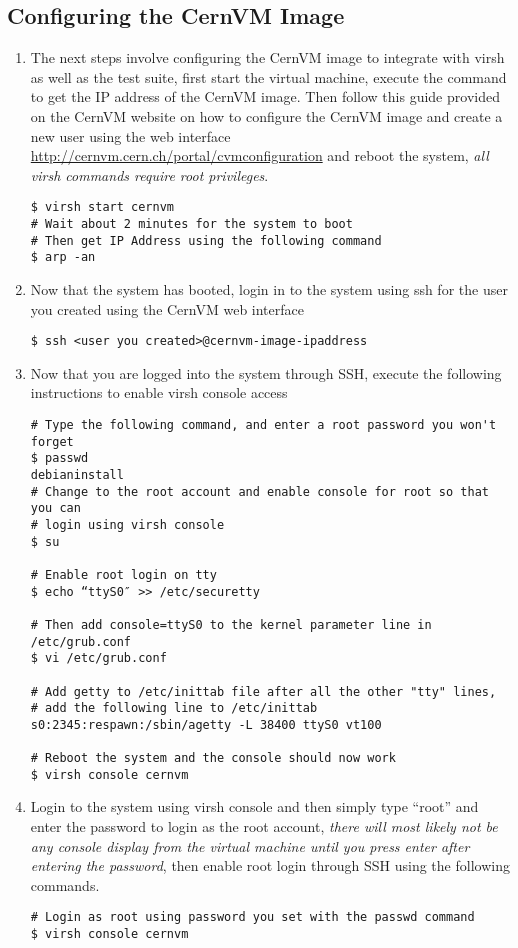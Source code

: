 \subsection{Configuring the CernVM Image}
\label{sec:cernvmconfig}
\begin{enumerate}
\item The next steps involve configuring the CernVM image to integrate with virsh as well as the test suite, first
start the virtual machine, execute the command to get the IP address of the CernVM image. Then follow this guide
provided on the CernVM website on how to configure the CernVM image and create a new user using the web interface \url{http://cernvm.cern.ch/portal/cvmconfiguration} and reboot the system, \emph{all virsh commands require root privileges}.
\begin{lstlisting}
$ virsh start cernvm
# Wait about 2 minutes for the system to boot 
# Then get IP Address using the following command
$ arp -an
\end{lstlisting}

\item Now that the system has booted, login in to the system using ssh for the user you created using the CernVM web interface
\begin{lstlisting}
$ ssh <user you created>@cernvm-image-ipaddress
\end{lstlisting}

\item Now that you are logged into the system through SSH, execute the following instructions to enable virsh console access
\lstset{caption= Enable Virsh Console Access}
\begin{lstlisting}
# Type the following command, and enter a root password you won't forget
$ passwd
debianinstall
# Change to the root account and enable console for root so that you can 
# login using virsh console
$ su

# Enable root login on tty
$ echo “ttyS0″ >> /etc/securetty

# Then add console=ttyS0 to the kernel parameter line in /etc/grub.conf
$ vi /etc/grub.conf

# Add getty to /etc/inittab file after all the other "tty" lines, 
# add the following line to /etc/inittab
s0:2345:respawn:/sbin/agetty -L 38400 ttyS0 vt100

# Reboot the system and the console should now work
$ virsh console cernvm
\end{lstlisting}

\item Login to the system using virsh console and then simply type ``root'' and enter the password to login as the 
root account, \emph{there will most likely not be any console display from the virtual machine until you press 
enter after entering the password}, then enable root login through SSH using the following commands.
\lstset{caption= Enable SSH Root Login}
\begin{lstlisting}
# Login as root using password you set with the passwd command
$ virsh console cernvm


\end{lstlisting}
\end{enumerate}
